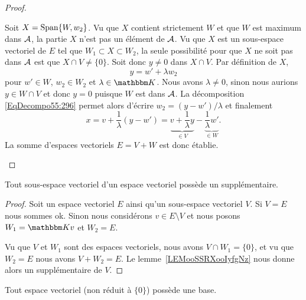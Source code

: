 \begin{proof}
\begin{subproof}
            Soit \( X=\operatorname{Span}\{ W,w_2 \}\). Vu que \( X\) contient strictement \( W\) et que \( W\) est maximum dans \( \mathcal{A}\), la partie \( X\) n'est pas un élément de \( \mathcal{A}\). Vu que \( X\) est un sous-espace vectoriel de \( E\) tel que \( W_1\subset X\subset W_2\), la seule possibilité pour que \( X\) ne soit pas dans \( \mathcal{A}\) est que \( X\cap V\neq \{ 0 \}\). Soit donc \( y\neq 0\) dans \( X\cap V\). Par définition de \( X\),
            \begin{equation}\label{EqDecompo55:296}
                y=w'+\lambda w_2
            \end{equation}
            pour \( w'\in W\), \( w_2\in W_2\) et \( \lambda\in \eK\). Nous avons \( \lambda\neq 0\), sinon nous aurions \( y\in W\cap V \) et donc \(y = 0 \) puisque \( W \) est dans \( \mathcal{A} \). La décomposition \eqref{EqDecompo55:296} permet alors d'écrire \( w_2=(y-w')/\lambda\) et finalement
            \begin{equation}
                x=v+\frac{1}{ \lambda }(y-w')=\underbrace{v+\frac{1}{ \lambda }y}_{\in V}-\underbrace{\frac{1}{ \lambda }w'}_{\in W}.
            \end{equation}
            La somme d'espaces vectoriels \( E=V+W\) est donc établie.
    \end{subproof}
\end{proof}

\begin{corollary}
    Tout sous-espace vectoriel d'un espace vectoriel possède un supplémentaire.
\end{corollary}

\begin{proof}
    Soit un espace vectoriel \( E\) ainsi qu'un sous-espace vectoriel \( V\). Si \( V=E\) nous sommes ok. Sinon nous considérons \( v\in E\setminus V\) et nous posons \( W_1=\eK v\) et \( W_2=E\).

    Vu que \( V\) et \( W_1\) sont des espaces vectoriels, nous avons \( V\cap W_1=\{ 0 \}\), et vu que \( W_2=E\) nous avons \( V+W_2=E\). Le lemme~\ref{LEMooSSRXooIyfgNz} nous donne alors un supplémentaire de \( V\).
\end{proof}

\begin{proposition}        \label{PROPooHDCEooMhDjPi}
    Tout espace vectoriel (non réduit à \( \{ 0 \}\)) possède une base.
\end{proposition}

